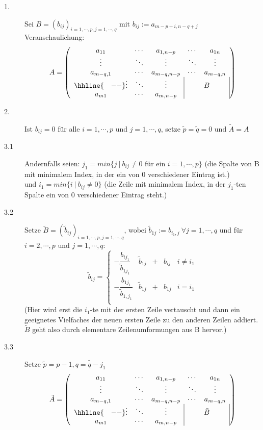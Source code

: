 \documentclass{scrbook}
\begin{document}
\begin{description}
\item[1.] Sei \(B= (b_{ij})_{i=1,\cdots ,p,j=1,\cdots ,q} \text{ mit }  b_{ij}:= a_{m-p+i,n-q+j}\)\\
Veranschaulichung:
\[
A=
\left(
\begin{array}{ccccc}
a_{11}&\cdots&a_{1,n-p}&\cdots &a_{1n}\\
\vdots&\ddots&\vdots&\ddots&\vdots\\
a_{m-q,1}&\cdots &a_{m-q,n-p} & \cdots & a_{m-q,n}\\
\hhline{~~~--}
\vdots & \ddots & \vdots &\multicolumn{2}{|c|}{B}\\ 
a_{m1} & \cdots & a_{m,n-p} & \multicolumn{2}{|c|}{} \\
\end{array}
\right)
\]
\item[2.] Ist \(b_{ij} = 0\) für alle \(i=1,\cdots ,p\) und \(j=1,\cdots ,q\), setze \(\tilde{p} = \tilde{q} = 0 \text{ und } \tilde{A} = A\)
\item[3.1] Andernfalls seien: \(j_1 = min\{j\ |\ b_{ij} \neq 0 \text{ für ein }i =1,\cdots ,p\}\)
(die Spalte von B mit minimalem Index, in der ein von 0 verschiedener Eintrag ist.)\\
und \(i_1=min\{i\ |\ b_{ij} \neq 0\}\)
(die Zeile mit minimalem Index, in der \(j_1\)-ten Spalte ein von 0 verschiedener Eintrag steht.)
\item[3.2] Setze \(\tilde{B} = (\tilde{b}_{ij})_{i=1,\cdots , p ,j=1,\cdots ,q}\),
wobei \(\tilde{b}_{1j} := b_{i_1,j}\ \forall j=1,\cdots ,q\)
und für \(i=2,\cdots,p\) und \(j=1,\cdots, q\):
\[
\tilde{b}_{ij} = 
\left\{
\begin{array}{cccccc}
-\dfrac{b_{ij_1}}{\tilde{b}_{1j_1}}&\tilde{b}_{1j}&+&b_{ij}&i\neq i_1\\
-\dfrac{b_{1j_1}}{\tilde{b}_{1,j_1}}&\tilde{b}_{1j}&+&b_{1j}&i= i_1\\
\end{array}
\right.
\]
(Hier wird erst die \(i_1\)-te mit der ersten Zeile vertauscht und dann ein geeignetes Vielfaches der neuen ersten Zeile zu den anderen Zeilen addiert. \(\tilde{B}\) geht also durch elementare Zeilenumformungen aus B hervor.)
\item[3.3] Setze \(\tilde{p} = p-1, \tilde{q = q-j_1}\)
\[
\tilde{A}=
\left(
\begin{array}{ccccc}
a_{11}&\cdots&a_{1,n-p}&\cdots &a_{1n}\\
\vdots&\ddots&\vdots&\ddots&\vdots\\
a_{m-q,1}&\cdots &a_{m-q,n-p} & \cdots & a_{m-q,n}\\
\hhline{~~~--}
\vdots & \ddots & \vdots &\multicolumn{2}{|c|}{\tilde{B}}\\ 
a_{m1} & \cdots & a_{m,n-p} & \multicolumn{2}{|c|}{} \\
\end{array}
\right)
\]
\end{description}
\end{document}
